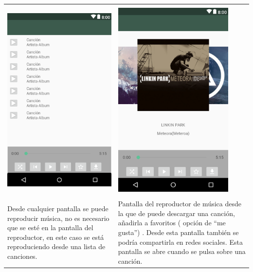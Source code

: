 \begin{tabular}{ p{6cm} p{6cm}}
\hline
\\
\includegraphics[width=6cm]{Figures/android/lista-reproductor.png}
&
\includegraphics[width=6cm]{Figures/android/Reproductor.png} \\
\hline
\\
Desde cualquier pantalla se puede reproducir música, no es necesario que se esté en la pantalla del reproductor, en este caso se está reproduciendo desde una lista de canciones.
&
Pantalla del reproductor de música desde la que de puede descargar una canción, añadirla a favoritos ( opción de “me gusta”) . Desde esta pantalla también se podría compartirla en redes sociales. 
Esta pantalla se abre cuando se pulsa sobre una canción. \\
\hline
\end{tabular}

